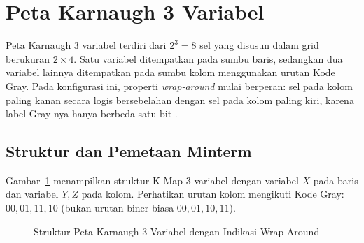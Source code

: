 \section{Peta Karnaugh 3 Variabel}

Peta Karnaugh 3 variabel terdiri dari $2^3 = 8$ sel yang disusun dalam grid berukuran $2 \times 4$. Satu variabel ditempatkan pada sumbu baris, sedangkan dua variabel lainnya ditempatkan pada sumbu kolom menggunakan urutan Kode Gray. Pada konfigurasi ini, properti \textit{wrap-around} mulai berperan: sel pada kolom paling kanan secara logis bersebelahan dengan sel pada kolom paling kiri, karena label Gray-nya hanya berbeda satu bit \cite{rosen2019}.

\subsection{Struktur dan Pemetaan Minterm}

Gambar~\ref{fig:kmap-3var} menampilkan struktur K-Map 3 variabel dengan variabel $X$ pada baris dan variabel $Y, Z$ pada kolom. Perhatikan urutan kolom mengikuti Kode Gray: $00, 01, 11, 10$ (bukan urutan biner biasa $00, 01, 10, 11$).

\begin{figure}[htbp]
\centering
{}
\caption{Struktur Peta Karnaugh 3 Variabel dengan Indikasi Wrap-Around}
\label{fig:kmap-3var}
\end{figure}

